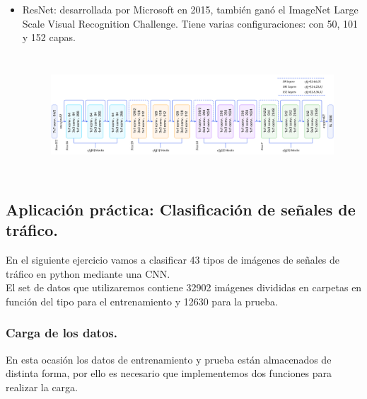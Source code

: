 \documentclass[a4paper,10pt]{article}
\begin{document}
\begin{itemize}
\begin{figure}[H]
\end{figure} 	
\item ResNet: desarrollada por Microsoft en 2015, también ganó el ImageNet Large Scale Visual Recognition Challenge. Tiene varias configuraciones: con 50, 101 y 152 capas.\begin{figure}[H]
\centering
\includegraphics[width=12.0cm, height=4.5cm]{resnet.png}
\end{figure} 	
\end{itemize}

\newpage

\subsection{Aplicación práctica: Clasificación de señales de tráfico.}
En el siguiente ejercicio vamos a clasificar 43 tipos de imágenes de señales de tráfico en python mediante una CNN. \\
El set de datos que utilizaremos contiene 32902 imágenes divididas en carpetas en función del tipo para el entrenamiento y 12630 para la prueba.
\subsubsection{Carga de los datos.}
En esta ocasión los datos de entrenamiento y prueba están almacenados de distinta forma, por ello es necesario que implementemos dos funciones para realizar la carga.
\end{document}
